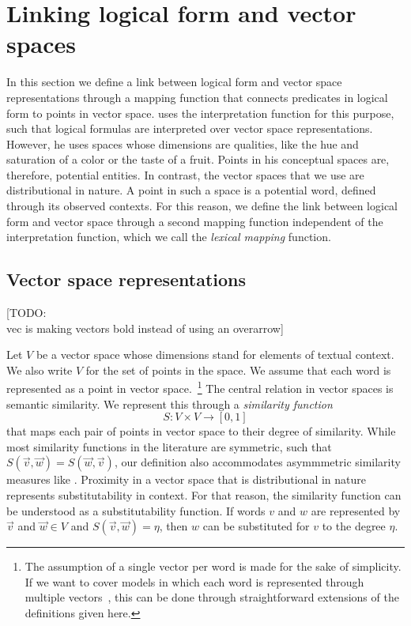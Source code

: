 \newcommand{\loglang}{\ensuremath{{\cal{L}}}\xspace}
\newcommand{\predsym}[1]{\ensuremath{{\cal{P}}_{#1}}\xspace}


\section{Linking logical form and vector spaces}
\label{sec:interface}

In this section we define a link between logical form and vector space
representations through a mapping function that connects predicates in
logical form to points in vector space. \citet{Gardenfors:04} uses the
interpretation function for this purpose, such that 
logical formulas are interpreted over vector space
representations. However, he uses spaces whose dimensions are
qualities, like the hue and saturation of a color or the taste of a
fruit. Points in his conceptual spaces are, therefore, potential
entities. In contrast, the vector spaces that we use are
distributional in nature. A point in such a space is a potential word,
defined through its observed contexts. For this reason, we define the link between logical form
and vector space through a second mapping function independent of the
interpretation function, which we call the \emph{lexical mapping}
function. 

\subsection*{Vector space representations} 

[TODO: \\vec is making vectors bold instead of using an overarrow]

Let $V$ be a vector space whose dimensions stand for elements of  textual
context. We also write $V$ for the set of points in the space. We assume that each word is represented as a point in vector
space.~\footnote{The assumption of a single vector per word is made
  for the sake of simplicity. If we want to cover models in which each word is
  represented through multiple
  vectors~\citep{ReisingerMooney:10,dinu-lapata:2010:EMNLP}, this can
  be done through straightforward extensions of the definitions given here.} The central relation in vector spaces is semantic
similarity. We represent this through a \textit{similarity function} \[S: V
\times V \to [0,1] \] that maps each pair of points in vector space to their
degree of similarity. While most similarity functions in the
literature are symmetric, such that  $S(\vec v, \vec w) = S(\vec w,
\vec v)$, our definition also accommodates asymmmetric similarity
measures like \citet{kotlerman:nlej2010}. Proximity in a
vector space that is distributional in nature represents
substitutability in context. For that reason, the similarity function can be understood as a
substitutability function.  If words $v$ and $w$ are represented by $\vec
v$ and $\vec w \in V$ and $S(\vec v, \vec w) = \eta$, then $w$ can be
substituted for $v$ to the degree $\eta$.

